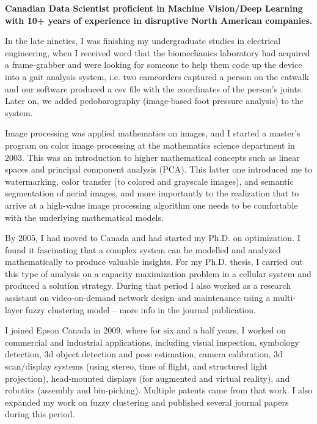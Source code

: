 \onehalfspace
\textbf{\large Canadian Data Scientist proficient in Machine Vision/Deep Learning with 10+ years of experience in 
disruptive North American companies.}
\singlespace

\vspace{1cm}

In the late nineties, I was finishing my undergraduate studies in electrical engineering, when I received word that the biomechanics laboratory had acquired a frame-grabber and were looking for someone to help them code up the device into a gait analysis system, i.e. two camcorders captured a person on the catwalk and our software produced  a csv file with the coordinates of the person's joints. Later on, we added pedobarography (image-based foot pressure analysis) to the system. 

\vspace{0.5cm}
Image processing was applied mathematics on images, and I started a master's program on color image processing at the mathematics  science department in 2003. This was an introduction to higher mathematical concepts such as linear spaces and principal component analysis (PCA). This latter one introduced me to watermarking, color transfer (to colored and grayscale images), and semantic segmentation of aerial images, and more importantly to the realization that to arrive at a high-value image processing algorithm one needs to be comfortable with the underlying mathematical models. 

\vspace{0.5cm}
By 2005, I had moved to Canada and had started my Ph.D. on optimization. I found it fascinating that a complex system can be modelled  and analyzed mathematically to produce valuable insights. For my Ph.D. thesis, I carried out this type of analysis on a capacity  maximization problem in a cellular system and produced a solution strategy.  During that period I also worked as a research assistant on video-on-demand network design and maintenance using a multi-layer fuzzy clustering model -- more info in the journal publication.

\vspace{0.5cm}
I joined Epson Canada in 2009, where for six and a half years, I worked on commercial and industrial applications, including visual inspection, symbology detection, 3d object detection and pose estimation, camera calibration, 3d scan/display systems (using stereo, time of flight, and structured light projection), head-mounted displays (for augmented and virtual reality), and robotics (assembly and bin-picking). Multiple patents came from that work. I also expanded my work on fuzzy clustering and published several journal papers during this period.

